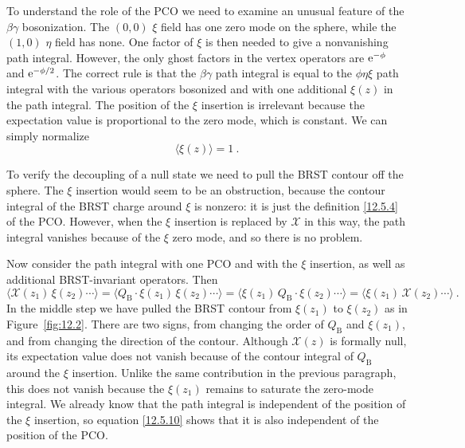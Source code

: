 To understand the role of the PCO we need to examine an unusual feature of the $\beta\gamma$ bosonization. The $(0,0)$ $\xi$ field has one zero mode on the sphere, while the $(1,0)$ $\eta$ field has none. One factor of $\xi$ is then needed to give a nonvanishing path integral. However, the only ghost factors in the vertex operators are $\mathrm{e}^{-\phi}$ and $\mathrm{e}^{-\phi/2}$. The correct rule is that the $\beta\gamma$ path integral is equal to the $\phi\eta\xi$ path integral with the various operators bosonized and with one additional $\xi(z)$ in the path integral. The position of the $\xi$ insertion is irrelevant because the expectation value is proportional to the zero mode, which is constant. We can simply normalize
\begin{equation}
	\langle \xi(z)\rangle = 1 \:. \label{12.5.9}
\end{equation}

To verify the decoupling of a null state we need to pull the BRST contour off the sphere. The $\xi$ insertion would seem to be an obstruction, because the contour integral of the BRST charge around $\xi$ is nonzero: it is just the definition \eqref{12.5.4} of the PCO. However, when the $\xi$ insertion is replaced by $\mathcal{X}$ in this way, the path integral vanishes because of the $\xi$ zero mode, and so there is no problem.

Now consider the path integral with one PCO and with the $\xi$ insertion, as well as additional BRST-invariant operators. Then
\begin{equation}
	\langle \mathcal{X}(z_1)\,\xi(z_2)\cdots\rangle = \langle Q_{\mathrm{B}}\cdot \xi(z_1)\,\xi(z_2)\cdots\rangle = \langle \xi(z_1)\,Q_{\mathrm{B}}\cdot \xi(z_2)\cdots\rangle = \langle \xi(z_1)\,\mathcal{X}(z_2)\cdots\rangle \:. \label{12.5.10}
\end{equation}
In the middle step we have pulled the BRST contour from $\xi(z_1)$ to $\xi(z_2)$ as in Figure~\ref{fig:12.2}. There are two signs, from changing the order of $Q_{\mathrm{B}}$ and $\xi(z_1)$, and from changing the direction of the contour. Although $\mathcal{X}(z)$ is formally null, its expectation value does not vanish because of the contour integral of $Q_{\mathrm{B}}$ around the $\xi$ insertion. Unlike the same contribution in the previous paragraph, this does not vanish because the $\xi(z_1)$ remains to saturate the zero-mode integral. We already know that the path integral is independent of the position of the $\xi$ insertion, so equation \eqref{12.5.10} shows that it is also independent of the position of the PCO.

